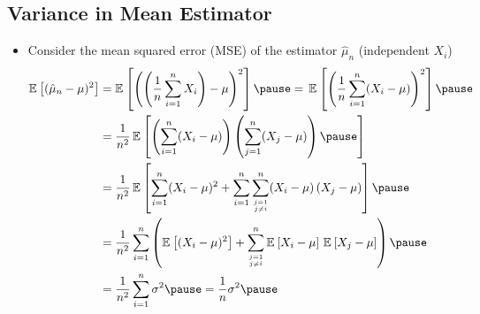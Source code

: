 
\begin{slide}
\section[-2]{Variance in Mean Estimator}

\begin{PauseHighLight}
  \begin{itemize}\small
    \item Consider the  mean squared error (MSE) of the estimator $\hat{\mu}_n$ (independent $X_i$)
      \begin{align*}
        \av{ (\hat{\mu}_n-\mu)^2 } &= \av{ \bra{\bra{\frac{1}{n}\sum_{i=1}^n
        X_i} - \mu}^2}\pause
        = \, \av{ \left( \frac{1}{n} \sum_{i=1}^n (X_i -\mu)\right)^2}\pause\\
        &= \frac{1}{n^2} \, \av{ \left(\sum_{i=1}^n (X_i -\mu)\right)\left(\sum_{j=1}^n (X_j -\mu)\right)\pause}\\
        &=\frac{1}{n^2} \, \av{ \sum_{i=1}^n (X_i -\mu)^2
          + \sum_{i=1}^n\sum_{j=1\atop j\neq i}^n (X_i-\mu)\,(X_j-\mu)}\pause\\
        &= \frac{1}{n^2}\sum_{i=1}^n \left( \av{(X_i -\mu)^2}
          + \sum_{j=1\atop j\neq i}^n
          \av{X_i-\mu}\,\av{X_j-\mu} \right)\pause\\
        &=\frac{1}{n^2} \sum_{i=1}^n \sigma^2\pause = \frac{1}{n} \sigma^2
        \pause
    \end{align*}
  
  \end{itemize}
\end{PauseHighLight}

\end{slide}


